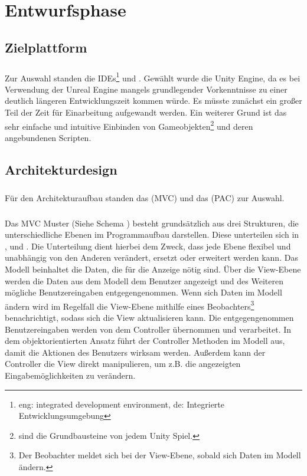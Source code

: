 \chapter{Entwurfsphase}
\section{Zielplattform}
\paragraph{}
Zur Auswahl standen die IDEs\footnote{eng: integrated development environment, de: Integrierte Entwicklungsumgebung}  und . Gewählt wurde die Unity Engine, da es bei Verwendung der Unreal Engine mangels grundlegender Vorkenntnisse zu einer deutlich längeren Entwicklungszeit kommen würde. Es müsste zunächst ein großer Teil der Zeit für Einarbeitung aufgewandt werden. 
Ein weiterer Grund ist das sehr einfache und intuitive Einbinden von Gameobjekten\footnote{ sind die Grundbausteine von jedem Unity Spiel.} und deren angebundenen Scripten.

\section{Architekturdesign}
\paragraph{}
Für den Architekturaufbau standen das  (MVC) und das  (PAC) zur Auswahl.
\paragraph{}
Das MVC Muster (Siehe Schema ) besteht grundsätzlich aus drei Strukturen, die unterschiedliche Ebenen im Programmaufbau darstellen.
Diese unterteilen sich in ,  und . Die Unterteilung dient hierbei dem Zweck, dass jede Ebene flexibel und unabhängig von den Anderen verändert, ersetzt oder erweitert werden kann. 
Das Modell beinhaltet die Daten, die für die Anzeige nötig sind. Über die View-Ebene werden die Daten aus dem Modell dem Benutzer angezeigt und des Weiteren mögliche Benutzereingaben entgegengenommen. Wenn sich Daten im Modell ändern wird im Regelfall die View-Ebene mithilfe eines Beobachters\footnote{Der Beobachter meldet sich bei der View-Ebene, sobald sich Daten im Modell ändern.} benachrichtigt, sodass sich die View aktualisieren kann. Die entgegengenommen Benutzereingaben werden von dem Controller übernommen und verarbeitet. In dem objektorientierten Ansatz führt der Controller Methoden im Modell aus, damit die Aktionen des Benutzers wirksam werden. Außerdem kann der Controller die View direkt manipulieren, um z.B. die angezeigten Eingabemöglichkeiten zu verändern. 
